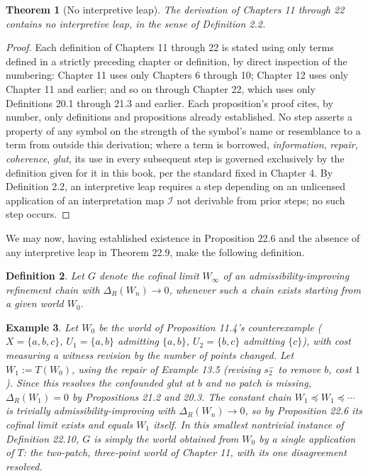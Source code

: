 \documentclass[11pt]{book}
\newtheorem{theorem}{Theorem}[chapter]
\newtheorem{definition}[theorem]{Definition}
\newtheorem{example}[theorem]{Example}
\begin{document}
\begin{theorem}[No interpretive leap]
The derivation of Chapters 11 through 22 contains no interpretive leap, in the sense of Definition 2.2.
\end{theorem}

\begin{proof}
Each definition of Chapters 11 through 22 is stated using only terms defined in a strictly preceding chapter or definition, by direct inspection of the numbering: Chapter 11 uses only Chapters 6 through 10; Chapter 12 uses only Chapter 11 and earlier; and so on through Chapter 22, which uses only Definitions 20.1 through 21.3 and earlier. Each proposition's proof cites, by number, only definitions and propositions already established. No step asserts a property of any symbol on the strength of the symbol's name or resemblance to a term from outside this derivation; where a term is borrowed, \emph{information}, \emph{repair}, \emph{coherence}, \emph{glut}, its use in every subsequent step is governed exclusively by the definition given for it in this book, per the standard fixed in Chapter 4. By Definition 2.2, an interpretive leap requires a step depending on an unlicensed application of an interpretation map $\mathcal I$ not derivable from prior steps; no such step occurs.
\end{proof}

We may now, having established existence in Proposition 22.6 and the absence of any interpretive leap in Theorem 22.9, make the following definition.

\begin{definition}
Let $G$ denote the cofinal limit $W_\infty$ of an admissibility-improving refinement chain with $\Delta_R(W_n) \to 0$, whenever such a chain exists starting from a given world $W_0$.
\end{definition}

\begin{example}
Let $W_0$ be the world of Proposition 11.4's counterexample ($X=\{a,b,c\}$, $U_1=\{a,b\}$ admitting $\{a,b\}$, $U_2=\{b,c\}$ admitting $\{c\}$), with cost measuring a witness revision by the number of points changed. Let $W_1 := T(W_0)$, using the repair of Example 13.5 (revising $s_2^-$ to remove $b$, cost $1$). Since this resolves the confounded glut at $b$ and no patch is missing, $\Delta_R(W_1) = 0$ by Propositions 21.2 and 20.3. The constant chain $W_1 \preceq W_1 \preceq \cdots$ is trivially admissibility-improving with $\Delta_R(W_n) \to 0$, so by Proposition 22.6 its cofinal limit exists and equals $W_1$ itself. In this smallest nontrivial instance of Definition 22.10, $G$ is simply the world obtained from $W_0$ by a single application of $T$: the two-patch, three-point world of Chapter 11, with its one disagreement resolved.
\end{example}
\end{document}
